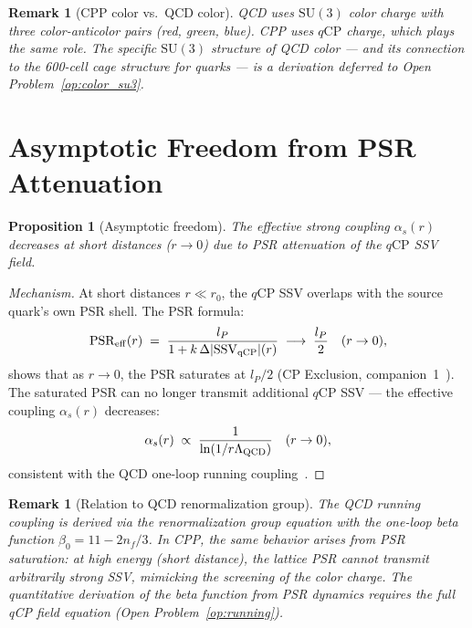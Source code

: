 \documentclass[12pt]{article}
\newtheorem{proposition}[theorem]{Proposition}
\newtheorem{remark}[theorem]{Remark}
\newcommand{\lP}{l_P}
\newcommand{\PSR}{\mathrm{PSR}}
\newcommand{\SSV}{\mathrm{SSV}}
\newcommand{\qCP}{q\mathrm{CP}}
\newcommand{\as}{\alpha_s}
\begin{document}
\begin{remark}[CPP color vs.\ QCD color]
QCD uses $\mathrm{SU}(3)$ color charge with three color-anticolor
pairs (red, green, blue). CPP uses $\qCP$ charge, which plays the
same role. The specific $\mathrm{SU}(3)$ structure of QCD color —
and its connection to the 600-cell cage structure for quarks — is a
derivation deferred to Open Problem~\ref{op:color_su3}.
\end{remark}

\section{Asymptotic Freedom from PSR Attenuation}
\label{sec:asymptotic}

\begin{proposition}[Asymptotic freedom]
\label{prop:asymptotic_freedom}
The effective strong coupling $\as(r)$ decreases at short distances
($r \to 0$) due to PSR attenuation of the $\qCP$ SSV field.
\end{proposition}

\begin{proof}[Mechanism]
At short distances $r \ll r_0$, the $\qCP$ SSV overlaps with the
source quark's own PSR shell. The PSR formula:
\begin{equation}
\PSR_{\rm eff}(r) \;=\; \frac{\lP}{1 + k\,\Delta|\SSV_{\rm qCP}|(r)}
\;\longrightarrow\; \frac{\lP}{2}
\quad (r \to 0),
\label{eq:psr_short}
\end{equation}
shows that as $r \to 0$, the PSR saturates at $\lP/2$ (CP Exclusion,
companion~1~\cite{c1}). The saturated PSR can no longer transmit
additional $\qCP$ SSV — the effective coupling $\as(r)$ decreases:
\begin{equation}
\as(r) \;\propto\; \frac{1}{\ln(1/r\Lambda_{\rm QCD})}
\quad (r \to 0),
\label{eq:as_running}
\end{equation}
consistent with the QCD one-loop running coupling~\cite{gross1973}.
\end{proof}

\begin{remark}[Relation to QCD renormalization group]
The QCD running coupling is derived via the renormalization group
equation with the one-loop beta function $\beta_0 = 11 - 2n_f/3$.
In CPP, the same behavior arises from PSR saturation: at high energy
(short distance), the lattice PSR cannot transmit arbitrarily strong
SSV, mimicking the screening of the color charge. The quantitative
derivation of the beta function from PSR dynamics requires the full
qCP field equation (Open Problem~\ref{op:running}).
\end{remark}
\end{document}
